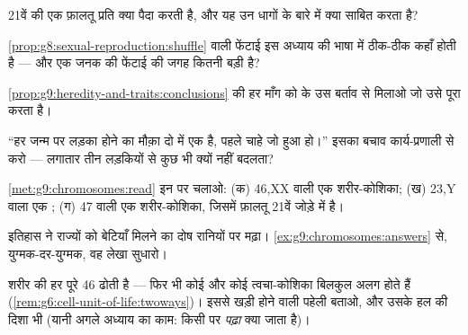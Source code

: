 \begin{exercise}[$\star$]\label{exo:g9:chromosomes:6}
21वें  की एक फ़ालतू प्रति क्या पैदा करती है, और यह उन धागों के
बारे में क्या साबित करता है?
\end{exercise}

\begin{exercise}[$\star\star$]\label{exo:g9:chromosomes:7}
\cref{prop:g8:sexual-reproduction:shuffle} वाली फेंटाई इस अध्याय की
भाषा में ठीक-ठीक कहाँ होती है --- और एक जनक की फेंटाई की जगह कितनी बड़ी
है?
\end{exercise}

\begin{exercise}[$\star\star$]\label{exo:g9:chromosomes:8}
\cref{prop:g9:heredity-and-traits:conclusions} की हर माँग को 
के उस बर्ताव से मिलाओ जो उसे पूरा करता है।
\end{exercise}

\begin{exercise}[$\star\star$]\label{exo:g9:chromosomes:9}
``हर जन्म पर लड़का होने का मौक़ा दो में एक है, पहले चाहे जो हुआ हो।''
इसका बचाव कार्य-प्रणाली से करो --- लगातार तीन लड़कियों से कुछ भी क्यों
नहीं बदलता?
\end{exercise}

\begin{exercise}[$\star\star$]\label{exo:g9:chromosomes:10}
\cref{met:g9:chromosomes:read} इन पर चलाओ: (क) 46,XX वाली एक
शरीर-कोशिका; (ख) 23,Y वाला एक ; (ग) 47 वाली एक शरीर-कोशिका,
जिसमें फ़ालतू 21वें जोड़े में है।
\end{exercise}

\begin{exercise}[$\star\star$]\label{exo:g9:chromosomes:11}
इतिहास ने राज्यों को बेटियाँ मिलने का दोष रानियों पर मढ़ा।
\cref{ex:g9:chromosomes:answers} से, युग्मक-दर-युग्मक, वह लेखा सुधारो।
\end{exercise}

\begin{exercise}[$\star\star\star$]\label{exo:g9:chromosomes:12}
शरीर की हर  पूरे 46 ढोती है --- फिर भी कोई  और कोई
त्वचा-कोशिका बिलकुल अलग होते हैं
(\cref{rem:g6:cell-unit-of-life:twoways})। इससे खड़ी होने वाली पहेली
बताओ, और उसके हल की दिशा भी (यानी अगले अध्याय का काम: किसी  पर
\emph{पढ़ा} क्या जाता है)।
\end{exercise}

